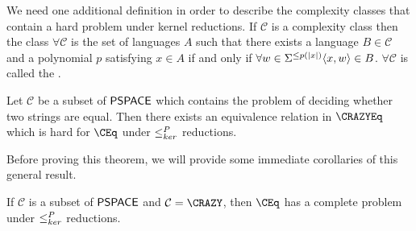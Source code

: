 We need one additional definition in order to describe the complexity classes that contain a hard problem under kernel reductions.
If $\mathcal{C}$ is a complexity class then the class $\forall\mathcal{C}$ is the set of languages $A$ such that there exists a language $B\in\mathcal{C}$ and a polynomial $p$ satisfying $x\in A$ if and only if $\forall w\in\Sigma^{\leq p(|x|)} \langle x,w\rangle\in B$.
$\forall\mathcal{C}$ is called the .

\begin{theorem}\label{thm:generalcompleteness}
  Let $\mathcal{C}$ be a subset of ${\mathsf{PSPACE}}$ which contains the problem of deciding whether two strings are equal.
  Then there exists an equivalence relation in $\CRAZYEq$ which is hard for $\CEq$ under $\leq^{P}_{ker}$ reductions.
\end{theorem}

Before proving this theorem, we will provide some immediate corollaries of this general result.

\begin{corollary}\label{cor:sufficient}
  If $\mathcal{C}$ is a subset of ${\mathsf{PSPACE}}$ and $\mathcal{C}=\CRAZY$, then $\CEq$ has a complete problem under $\leq^{P}_{ker}$ reductions.
\end{corollary}

